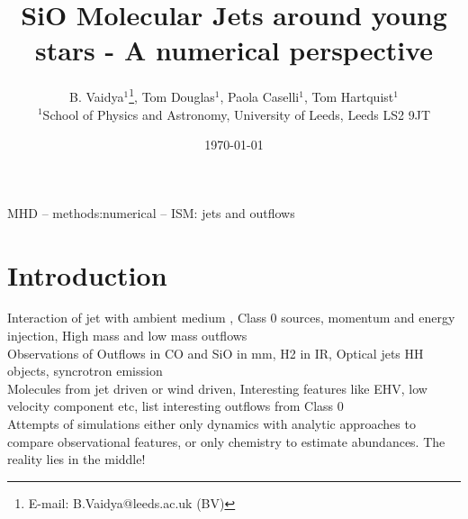 \documentclass[useAMS,usenatbib,letters]{mn2e}
\begin{document}
\title{SiO Molecular Jets around young stars - A numerical perspective}
\author[B. Vaidya, Tom Douglas, Paola Caselli, Tom Hartquist]{B. Vaidya$^{1}$\thanks{E-mail:
B.Vaidya@leeds.ac.uk (BV)}, Tom Douglas$^{1}$, Paola Caselli$^{1}$, Tom Hartquist$^{1}$\\
$^{1}$School of Physics and Astronomy, University of Leeds, Leeds LS2
9JT\\
}

\date\today

\pagerange{\pageref{firstpage}--\pageref{lastpage}} 


\maketitle

\label{firstpage}

\begin{abstract}
  {}  
   {}
   {}
   {}
\end{abstract}

   \begin{keywords}
    MHD -- methods:numerical -- ISM: jets and outflows
   \end{keywords}


%
%


\section{Introduction} 
Interaction of jet with ambient medium , Class 0 sources, momentum and
energy injection, High mass and low mass outflows \\

Observations of Outflows in CO and SiO in mm, H2 in IR, Optical jets
HH objects, syncrotron emission \\

Molecules from jet driven or wind driven, Interesting features like
EHV, low velocity component etc, list interesting outflows from Class 0 \\

Attempts of simulations either only dynamics with analytic approaches
to compare observational features, or only chemistry to estimate
abundances. The reality lies in the middle!\\
\end{document}
